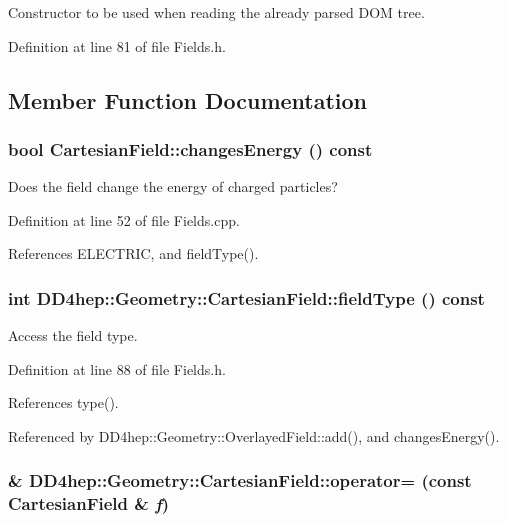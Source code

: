 Constructor to be used when reading the already parsed DOM tree. 

Definition at line 81 of file Fields.h.

\subsection{Member Function Documentation}
\hypertarget{class_d_d4hep_1_1_geometry_1_1_cartesian_field_ae90a6c790ecc560abf0d44a59f2e9364}{
\subsubsection[{changesEnergy}]{\setlength{\rightskip}{0pt plus 5cm}bool CartesianField::changesEnergy () const}}
\label{class_d_d4hep_1_1_geometry_1_1_cartesian_field_ae90a6c790ecc560abf0d44a59f2e9364}


Does the field change the energy of charged particles? 

Definition at line 52 of file Fields.cpp.

References ELECTRIC, and fieldType().\hypertarget{class_d_d4hep_1_1_geometry_1_1_cartesian_field_a75f08636b6349cfd0ec276d09187af2f}{
\subsubsection[{fieldType}]{\setlength{\rightskip}{0pt plus 5cm}int DD4hep::Geometry::CartesianField::fieldType () const}}
\label{class_d_d4hep_1_1_geometry_1_1_cartesian_field_a75f08636b6349cfd0ec276d09187af2f}


Access the field type. 

Definition at line 88 of file Fields.h.

References type().

Referenced by DD4hep::Geometry::OverlayedField::add(), and changesEnergy().\hypertarget{class_d_d4hep_1_1_geometry_1_1_cartesian_field_a2f848b1b5eb1cf751e58c7d2076dd915}{
\subsubsection[{operator=}]{\& DD4hep::Geometry::CartesianField::operator= (const {\bf CartesianField} \& {\em f})}}
\label{class_d_d4hep_1_1_geometry_1_1_cartesian_field_a2f848b1b5eb1cf751e58c7d2076dd915}


